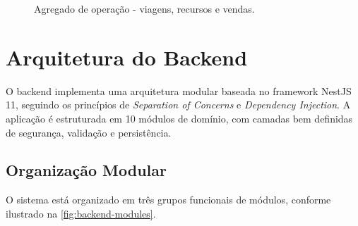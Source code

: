 \begin{figure}[H]
  \caption{Agregado de operação - viagens, recursos e vendas.}
\end{figure}

\section{Arquitetura do Backend}

O backend implementa uma arquitetura modular baseada no framework NestJS 11, seguindo os princípios de \textit{Separation of Concerns} e \textit{Dependency Injection}. A aplicação é estruturada em 10 módulos de domínio, com camadas bem definidas de segurança, validação e persistência.

\subsection{Organização Modular}

O sistema está organizado em três grupos funcionais de módulos, conforme ilustrado na \autoref{fig:backend-modules}.

